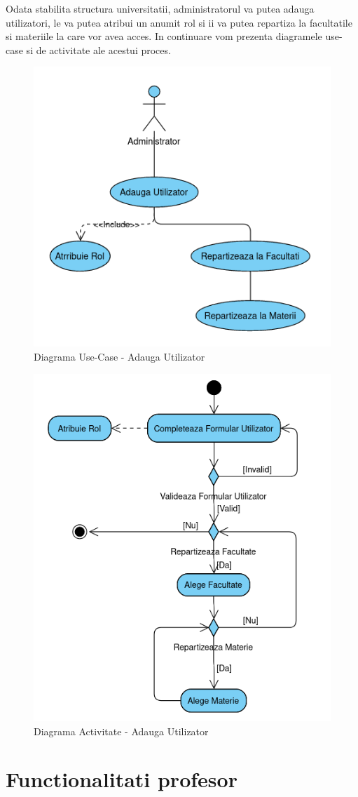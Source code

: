 \documentclass[12pt, a4paper, oneside, romanian]{teza-upb}
\begin{document}
Odata stabilita structura universitatii, administratorul va putea adauga utilizatori, le va putea atribui un anumit rol si ii va putea repartiza la facultatile si materiile la care vor avea acces. In continuare vom prezenta diagramele use-case si de activitate ale acestui proces.

\begin{figure}[H]
\centering
\includegraphics*[width=0.525\columnwidth]{diagrama-use-case-adauga-utilizator}
\caption{Diagrama Use-Case - Adauga Utilizator}
\label{diagrama-use-case-adauga-utilizator}
\end{figure}


\begin{figure}[H]
\centering
\includegraphics*[width=0.6\columnwidth]{diagrama-activitate-adauga-utilizator}
\caption{Diagrama Activitate - Adauga Utilizator}
\label{diagrama-activitate-adauga-utilizator}
\end{figure}



\section{Functionalitati profesor}
\end{document}
